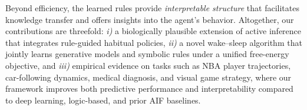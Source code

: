 \documentclass{article} %
\begin{document}
Beyond efficiency, the learned rules provide \emph{interpretable structure} that facilitates knowledge transfer and offers insights into the agent’s behavior. Altogether, our contributions are threefold: {\it i)} a biologically plausible extension of active inference that integrates rule-guided habitual policies, {\it ii)} a novel wake--sleep algorithm that jointly learns generative models and symbolic rules under a unified free-energy objective, and {\it iii)} empirical evidence on tasks such as NBA player trajectories, car-following dynamics, medical diagnosis, and visual game strategy, where our framework improves both predictive performance and interpretability compared to deep learning, logic-based, and prior AIF baselines.

\end{document}

